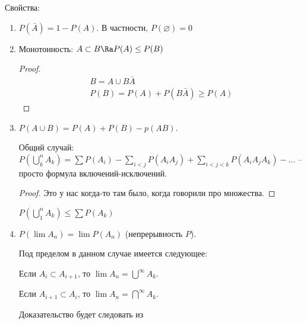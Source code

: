 Свойства:
\begin{enumerate}
    \item $P(\bar A) = 1 - P(A)$. В частности, $P(\varnothing) = 0$
    \item Монотонность: $A \subset B \Ra P(A) \leq P(B)$
    \begin{proof}
        \begin{gather*} 
            B = A \cup B\bar A \\
            P(B) = P(A) + P(B\bar A) \geq P(A)
        \end{gather*}
    \end{proof}
    \item $P(A \cup B) = P(A) + P(B) - p(AB)$. 
    
    Общий случай: $P(\bigcup\limits_k^n A_k) = \sum P(A_i) - \sum\limits_{i<j} P(A_iA_j) + \sum\limits_{i < j < k}P(A_iA_jA_k) - \dots$ -- просто формула включений-исключений.
    \begin{proof}
        Это у нас когда-то там было, когда говорили про множества.
    \end{proof}
    \begin{conseq}
    $P(\bigcup\limits_1^n A_k) \leq \sum P(A_k)$
    \end{conseq}

    \item
    $P(\lim A_n) = \lim P(A_n)$ (непрерывность $P$).

    Под пределом в данном случае имеется следующее: 
    
    Если $A_i \subset A_{i+1}$, то $\lim A_n = \bigcup\limits^{\infty} A_k$. 
    
    Если $A_{i+1} \subset A_{i}$, то $\lim A_n = \bigcap\limits^{\infty} A_k$. 

    Доказательство будет следовать из


\end{enumerate}
